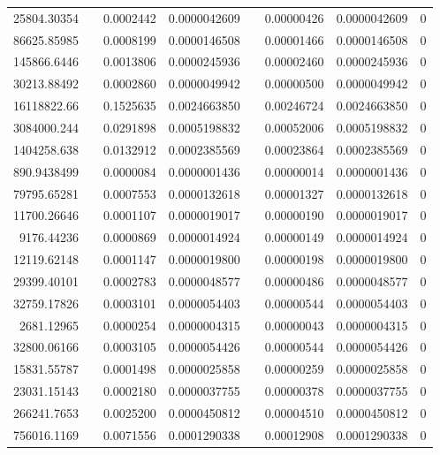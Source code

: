 \documentclass[
journal=jacsat, %
manuscript=article]{achemso}
\begin{document}
\begin{table}[htbp]
{\begin{tabular}{rrrrrrrr}
    25804.30354 &       & 0.0002442 & 0.0000042609 &       & 0.00000426 & 0.0000042609 & 0 \\
    86625.85985 &       & 0.0008199 & 0.0000146508 &       & 0.00001466 & 0.0000146508 & 0 \\
    145866.6446 &       & 0.0013806 & 0.0000245936 &       & 0.00002460 & 0.0000245936 & 0 \\
    30213.88492 &       & 0.0002860 & 0.0000049942 &       & 0.00000500 & 0.0000049942 & 0 \\
    16118822.66 &       & 0.1525635 & 0.0024663850 &       & 0.00246724 & 0.0024663850 & 0 \\
    3084000.244 &       & 0.0291898 & 0.0005198832 &       & 0.00052006 & 0.0005198832 & 0 \\
    1404258.638 &       & 0.0132912 & 0.0002385569 &       & 0.00023864 & 0.0002385569 & 0 \\
    890.9438499 &       & 0.0000084 & 0.0000001436 &       & 0.00000014 & 0.0000001436 & 0 \\
    79795.65281 &       & 0.0007553 & 0.0000132618 &       & 0.00001327 & 0.0000132618 & 0 \\
    11700.26646 &       & 0.0001107 & 0.0000019017 &       & 0.00000190 & 0.0000019017 & 0 \\
    9176.44236 &       & 0.0000869 & 0.0000014924 &       & 0.00000149 & 0.0000014924 & 0 \\
    12119.62148 &       & 0.0001147 & 0.0000019800 &       & 0.00000198 & 0.0000019800 & 0 \\
    29399.40101 &       & 0.0002783 & 0.0000048577 &       & 0.00000486 & 0.0000048577 & 0 \\
    32759.17826 &       & 0.0003101 & 0.0000054403 &       & 0.00000544 & 0.0000054403 & 0 \\
    2681.12965 &       & 0.0000254 & 0.0000004315 &       & 0.00000043 & 0.0000004315 & 0 \\
    32800.06166 &       & 0.0003105 & 0.0000054426 &       & 0.00000544 & 0.0000054426 & 0 \\
    15831.55787 &       & 0.0001498 & 0.0000025858 &       & 0.00000259 & 0.0000025858 & 0 \\
    23031.15143 &       & 0.0002180 & 0.0000037755 &       & 0.00000378 & 0.0000037755 & 0 \\
    266241.7653 &       & 0.0025200 & 0.0000450812 &       & 0.00004510 & 0.0000450812 & 0 \\
    756016.1169 &       & 0.0071556 & 0.0001290338 &       & 0.00012908 & 0.0001290338 & 0 \\

\end{tabular}}
\end{table}
\end{document}
